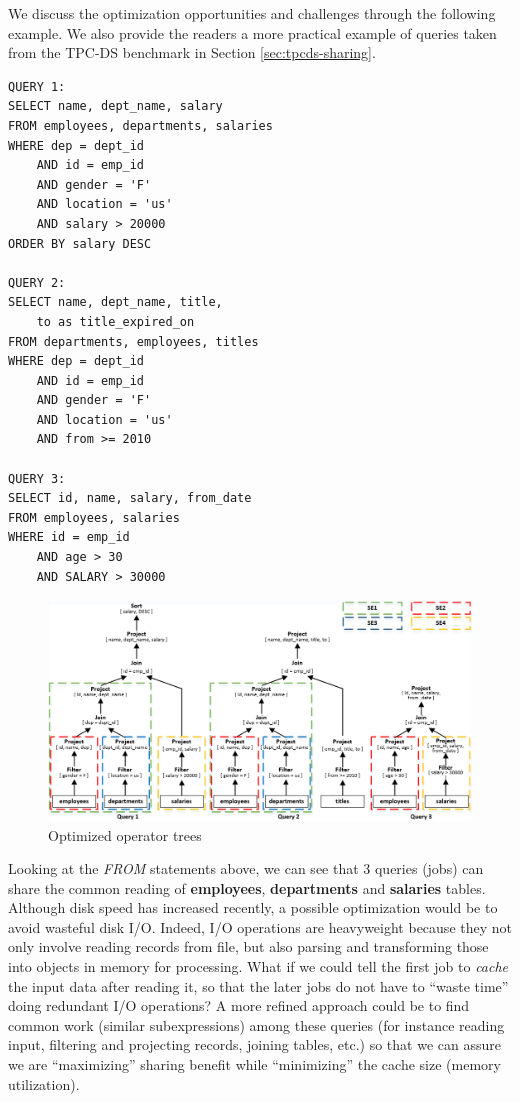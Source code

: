 We discuss the optimization opportunities and challenges through the following example. We also provide the readers a more practical example of queries taken from the TPC-DS benchmark \cite{tpcds} in Section \ref{sec:tpcds-sharing}.

\begingroup
\fontsize{8pt}{9pt}
\selectfont
\begin{verbatim}
QUERY 1:
SELECT name, dept_name, salary
FROM employees, departments, salaries
WHERE dep = dept_id
	AND id = emp_id
	AND gender = 'F'
	AND location = 'us'
	AND salary > 20000
ORDER BY salary DESC

QUERY 2:
SELECT name, dept_name, title, 
	to as title_expired_on
FROM departments, employees, titles
WHERE dep = dept_id
	AND id = emp_id
	AND gender = 'F'
	AND location = 'us'
	AND from >= 2010

QUERY 3:
SELECT id, name, salary, from_date
FROM employees, salaries
WHERE id = emp_id
	AND age > 30
	AND SALARY > 30000
\end{verbatim}
\endgroup

\begin{figure}[htbp]
	\centering
	\includegraphics[scale=0.65]{figures/common_sub}
	\caption{Optimized operator trees} 
	\label{fig:common_sub}
\end{figure}

Looking at the \emph{FROM} statements above, we can see that 3 queries (jobs) can share the common reading of \textbf{employees}, \textbf{departments} and \textbf{salaries} tables. Although disk speed has increased recently, a possible optimization would be to avoid wasteful disk I/O. Indeed, I/O operations are heavyweight because they not only involve reading records from file, but also parsing and transforming those into objects in memory for processing. What if we could tell the first job to \emph{cache} the input data after reading it, so that the later jobs do not have to ``waste time'' doing redundant I/O operations? A more refined approach could be to find common work (similar subexpressions) among these queries (for instance reading input, filtering and projecting records, joining tables, etc.) so that we can assure we are ``maximizing'' sharing benefit while ``minimizing'' the cache size (memory utilization).

